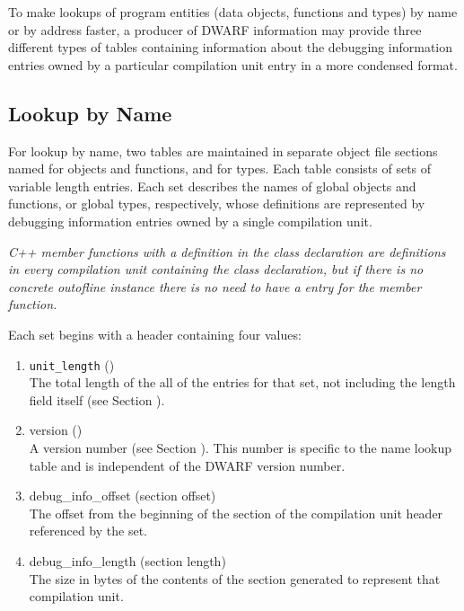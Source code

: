 To make lookups of program entities (data objects, functions
and types) by name or by address faster, a producer of DWARF
information may provide three different types of tables
containing information about the debugging information
entries owned by a particular compilation unit entry in a
more condensed format.

\subsection{Lookup by Name}

For lookup by name, 
two tables are maintained in separate
object file sections named 
\dotdebugpubnames{} for objects and
functions, and 
\dotdebugpubtypes{}
for types. Each table consists
of sets of variable length entries. Each set describes the
names of global objects and functions, or global types,
respectively, whose definitions are represented by debugging
information entries owned by a single compilation unit.

\textit{C++ member functions with a definition in the class declaration
are definitions in every compilation unit containing the
class declaration, but if there is no concrete out\dash of\dash line
instance there is no need to have a 
\dotdebugpubnames{} entry
for the member function.}

Each set begins with a header containing four values:
\begin{enumerate}[1. ]

\item \texttt{unit\_length} () \\
The total length of the all of the entries for that set,
not including the length field itself 
(see Section ).

\item  version () \\
A version number
(see Section ). 
This number is specific
to the name lookup table and is independent of the DWARF
version number.

\item debug\_info\_offset (section offset) \\
The 
offset 
from the beginning of the 
\dotdebuginfo{} section of
the compilation unit header referenced by the set.

\item debug\_info\_length (section length) \\
The 
size in bytes of the contents of the 
\dotdebuginfo{} section
generated to represent that compilation unit.
\end{enumerate}

